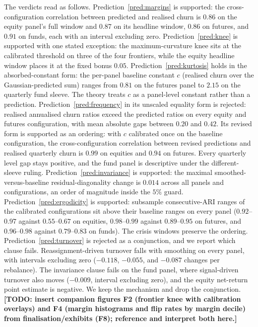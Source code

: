 \documentclass{rQUF2e}
\theoremstyle{plain}
\theoremstyle{remark}
\newcommand{\TODO}[1]{\textbf{[TODO: #1]}}
\begin{document}
The verdicts read as follows. Prediction~\ref{pred:margins} is supported: the
cross-configuration correlation between predicted and realised churn is
$0.86$ on the equity panel's full window and $0.87$ on its headline window,
$0.86$ on futures, and $0.91$ on funds, each with an interval excluding zero.
Prediction~\ref{pred:knee} is supported with one stated exception: the
maximum-curvature knee sits at the calibrated threshold on three of the four
frontiers, while the equity headline window places it at the fixed bonus
$0.05$. Prediction~\ref{pred:kurtosis} holds in the absorbed-constant form:
the per-panel baseline constant $c$ (realised churn over the
Gaussian-predicted sum) ranges from $0.81$ on the futures panel to $2.15$ on
the quarterly fund sleeve. The theory treats $c$ as a panel-level constant
rather than a prediction.
Prediction~\ref{pred:frequency} in its unscaled equality form is rejected:
realised annualised churn ratios exceed the predicted ratios on every equity
and futures configuration, with mean absolute gaps between $0.20$ and $0.42$.
Its revised form is supported as an ordering: with $c$ calibrated once on the
baseline configuration, the cross-configuration correlation between revised
predictions and realised quarterly churn is $0.99$ on equities and $0.94$ on
futures. Every quarterly level gap stays positive, and the fund panel is
descriptive under the different-sleeve ruling.
Prediction~\ref{pred:invariance} is supported: the maximal
smoothed-versus-baseline residual-diagonality change is $0.014$ across all
panels and configurations, an order of magnitude inside the $5\%$ guard.
Prediction~\ref{pred:ergodicity} is supported: subsample consecutive-ARI
ranges of the calibrated configurations sit above their baseline ranges on
every panel ($0.92$--$0.97$ against $0.55$--$0.67$ on equities,
$0.98$--$0.99$ against $0.89$--$0.95$ on futures, and $0.96$--$0.98$ against
$0.79$--$0.83$ on funds). The crisis windows preserve the ordering.
Prediction~\ref{pred:turnover} is rejected as a conjunction, and we report
which clause fails. Reassignment-driven turnover falls with smoothing on
every panel, with intervals excluding zero ($-0.118$, $-0.055$, and $-0.087$
changes per rebalance). The invariance clause fails on the fund panel, where
signal-driven turnover also moves ($-0.009$, interval excluding zero), and
the equity net-return point estimate is negative. We keep the mechanism and
drop the conjunction.
\TODO{insert companion figures F2 (frontier knee with calibration overlays)
and F4 (margin histograms and flip rates by margin decile) from
finalisation/exhibits (F8); reference and interpret both here.}
\end{document}
